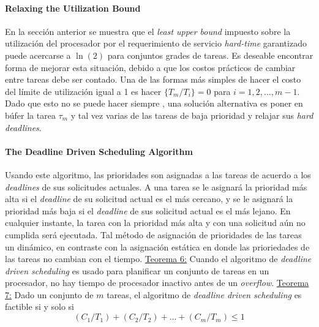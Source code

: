 \paragraph{\textnormal{\textbf{Relaxing the Utilization Bound}}}
En la sección anterior se muestra que el \emph{least upper bound} impuesto sobre la utilización del procesador por el requerimiento de servicio \emph{hard-time} garantizado puede acercarse a $\ln (2)$ para conjuntos grades de tareas. Es deseable encontrar forma de mejorar esta situación, debido a que los costos prácticos de cambiar entre tareas debe ser contado. Una de las formas más simples de hacer el costo del límite de utilización igual a 1 es hacer $\{T_m/T_i\} = 0$ para $i = 1,2,\dots,m - 1$. Dado que esto no se puede hacer siempre , una solución alternativa es poner en búfer la tarea $\tau_m$ y tal vez varias de las tareas de baja prioridad y relajar sus \emph{hard deadlines}.


\paragraph{\textnormal{\textbf{The Deadline Driven Scheduling Algorithm}}}
Usando este algoritmo, las prioridades son asignadas a las tareas de acuerdo a los \emph{deadlines} de sus solicitudes actuales. A una tarea se le asignará la prioridad más alta si el \emph{deadline} de su solicitud actual es el más cercano, y se le asignará la prioridad más baja si el \emph{deadline} de sus solicitud actual es el más lejano. En cualquier instante, la tarea con la prioridad más alta y con una solicitud aún no cumplida será ejecutada. Tal método de asignación de prioridades de las tareas un dinámico, en contraste con la asignación estática en donde las prioriedades de las tareas no cambian con el tiempo. \underline{Teorema 6:} Cuando el algoritmo de \emph{deadline driven scheduling} es usado para planificar un conjunto de tareas en un procesador, no hay tiempo de procesador inactivo antes de un \emph{overflow}. \underline{Teorema 7:} Dado un conjunto de $m$ tareas, el algoritmo de \emph{deadline driven scheduling} es factible si y solo si $$(C_1/T_1) + (C_2/T_2) + \dots + (C_m/T_m) \leq 1$$

